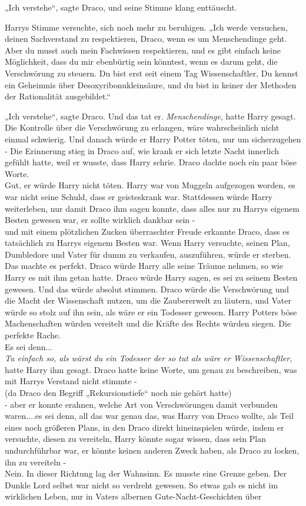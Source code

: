 {„Ich verstehe“, sagte Draco, und seine Stimme klang enttäuscht.

Harrys Stimme versuchte, sich noch mehr zu beruhigen. „Ich werde versuchen, deinen Sachverstand zu respektieren, Draco, wenn es um Menschendinge geht. Aber du musst auch mein Fachwissen respektieren, und es gibt einfach keine Möglichkeit, dass du mir ebenbürtig sein könntest, wenn es darum geht, die Verschwörung zu steuern. Du bist erst seit einem Tag Wissenschaftler, Du kennst ein Geheimnis über Desoxyribonukleinsäure, und du bist in keiner der Methoden der Rationalität ausgebildet.“

„Ich verstehe“, sagte Draco. Und das tat er. \emph{Menschendinge}, hatte Harry gesagt. Die Kontrolle über die Verschwörung zu erlangen, wäre wahrscheinlich nicht einmal schwierig. Und danach würde er Harry Potter töten, nur um sicherzugehen - Die Erinnerung stieg in Draco auf, wie krank er sich letzte Nacht innerlich gefühlt hatte, weil er wusste, dass Harry schrie. Draco dachte noch ein paar böse Worte.\\ Gut, er würde Harry nicht töten. Harry war von Muggeln aufgezogen worden, es war nicht seine Schuld, dass er geisteskrank war. Stattdessen würde Harry weiterleben, nur damit Draco ihm sagen konnte, dass alles nur zu Harrys eigenem Besten gewesen war, er sollte wirklich dankbar sein -\\ und mit einem plötzlichen Zucken überraschter Freude erkannte Draco, dass es tatsächlich zu Harrys eigenem Besten war. Wenn Harry versuchte, seinen Plan, Dumbledore und Vater für dumm zu verkaufen, auszuführen, würde er sterben. Das machte es perfekt. Draco würde Harry alle seine Träume nehmen, so wie Harry es mit ihm getan hatte. Draco würde Harry sagen, es sei zu seinem Besten gewesen. Und das würde absolut stimmen. Draco würde die Verschwörung und die Macht der Wissenschaft nutzen, um die Zaubererwelt zu läutern, und Vater würde so stolz auf ihn sein, als wäre er ein Todesser gewesen. Harry Potters böse Machenschaften würden vereitelt und die Kräfte des Rechts würden siegen. Die perfekte Rache.\\ Es sei denn...\\ \emph{Tu einfach so, als wärst du ein Todesser der so tut als wäre er Wissenschaftler},\\ hatte Harry ihm gesagt. Draco hatte keine Worte, um genau zu beschreiben, was mit Harrys Verstand nicht stimmte -\\ (da Draco den Begriff „Rekursionstiefe“ noch nie gehört hatte)\\ - aber er konnte erahnen, welche Art von Verschwörungen damit verbunden waren....es sei denn, all das war genau das, was Harry von Draco wollte, als Teil eines noch größeren Plans, in den Draco direkt hineinspielen würde, indem er versuchte, diesen zu vereiteln, Harry könnte sogar wissen, dass sein Plan undurchführbar war, er könnte keinen anderen Zweck haben, als Draco zu locken, ihn zu vereiteln -\\ Nein. In dieser Richtung lag der Wahnsinn. Es musste eine Grenze geben. Der Dunkle Lord selbst war nicht so verdreht gewesen. So etwas gab es nicht im wirklichen Leben, nur in Vaters albernen Gute-Nacht-Geschichten über }
